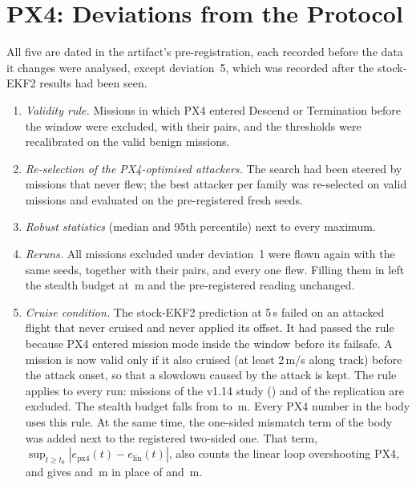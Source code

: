 \section{PX4: Deviations from the Protocol}
\label{app:px4dev}
All five are dated in the artifact's pre-registration, each recorded before the
data it changes were analysed, except deviation~5, which was recorded after the
stock-EKF2 results had been seen.
\begin{enumerate}
\item \emph{Validity rule.} Missions in which PX4 entered Descend or Termination
  before the window were excluded, with their pairs, and the thresholds were
  recalibrated on the \nPxBenign{} valid benign missions.
\item \emph{Re-selection of the PX4-optimised attackers.} The search had been
  steered by missions that never flew; the best attacker per family was
  re-selected on valid missions and evaluated on the pre-registered fresh seeds.
\item \emph{Robust statistics} (median and 95th percentile) next to every
  maximum.
\item \emph{Reruns.} All \nPxRerun{} missions excluded under deviation~1 were flown
  again with the same seeds, together with their pairs, and every one flew. Filling
  them in left the stealth budget at \nPxDadvReg\,m and the pre-registered reading
  unchanged.
\item \emph{Cruise condition.} The stock-EKF2 prediction at 5\,s failed on an
  attacked flight that never cruised and never applied its offset. It had passed
  the rule because PX4 entered mission mode inside the window before its
  failsafe. A mission is now valid only if it also cruised (at least 2\,m/s along
  track) before the attack onset, so that a slowdown caused by the attack is
  kept. The rule applies to every run: \nPxStillExcl{} missions of the v1.14
  study (\nPxStillExclPct) and \nStExcl{} of the replication are excluded. The
  stealth budget falls from \nPxDadvReg{} to \nPxDadv\,m. Every PX4 number in the
  body uses this rule. At the same time, the one-sided mismatch term of the body
  was added next to the registered two-sided one. That term,
  $\sup_{t\ge t_0}|e_{\mathrm{px4}}(t)-e_{\mathrm{lin}}(t)|$, also counts the linear
  loop overshooting PX4, and gives \nMmFivePointStat{} and \nMmOnePointStat\,m in
  place of \nMmFivePlusStat{} and \nMmOnePlusStat\,m.
\end{enumerate}
